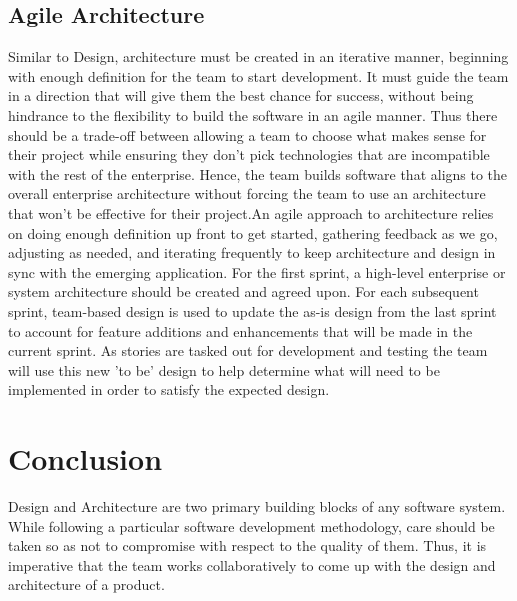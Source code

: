\documentclass[sigplan,screen]{acmart}
\begin{document}
\subsection{Agile Architecture}
Similar to Design, architecture must be created in an iterative manner, beginning with enough definition for the team to start development. It must guide the team in a direction that will give them the best chance for success, without being hindrance to the flexibility to build the software in an agile manner. Thus there should be a trade-off between allowing a team to choose what makes sense for their project while ensuring they don't pick technologies that are incompatible with the rest of the enterprise. Hence, the team builds software that aligns to the overall enterprise architecture without forcing the team to use an architecture that won’t be effective for their project.An agile approach to architecture relies on doing enough definition up front to get started, gathering feedback as we go, adjusting as needed, and iterating frequently to keep architecture and design in sync with the emerging application. For the first sprint, a high-level enterprise or system architecture should be created and agreed upon. For each subsequent sprint, team-based design is used to update the as-is design from the last sprint to account for feature additions and enhancements that will be made in the current sprint. As stories are tasked out for development and testing the team will use this new 'to be' design to help determine what will need to be implemented in order to satisfy the expected design.

\section{Conclusion}
Design and Architecture are two primary building blocks of any software system. While following a particular software development methodology, care should be taken so as not to compromise with respect to the quality of them. Thus, it is imperative that the team works collaboratively to come up with the design and architecture of a product.



\end{document}
